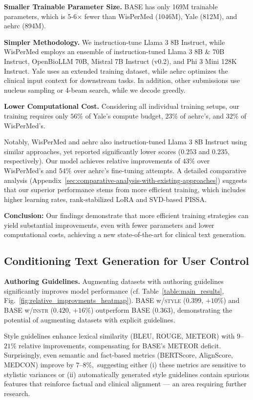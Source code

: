 \textbf{Smaller Trainable Parameter Size.} BASE has only 169M trainable parameters, which is 5-6× fewer than WisPerMed (1046M), Yale (812M), and aehrc (894M).

\textbf{Simpler Methodology.} We instruction-tune Llama 3 8B Instruct, while WisPerMed employs an ensemble of instruction-tuned Llama 3 8B \& 70B Instruct, OpenBioLLM 70B, Mistral 7B Instruct (v0.2), and Phi 3 Mini 128K Instruct. Yale uses an extended training dataset, while aehrc optimizes the clinical input context for downstream tasks. In addition, other submissions use nucleus sampling or 4-beam search, while we decode greedly.

\textbf{Lower Computational Cost.} Considering all individual training setups, our training requires only $56\%$ of Yale’s compute budget, $23\%$ of aehrc’s, and $32\%$ of WisPerMed’s.

Notably, WisPerMed and aehrc also instruction-tuned Llama 3 8B Instruct using similar approaches, yet reported significantly lower scores ($0.253$ and $0.235$, respectively). Our model achieves relative improvements of $43\%$ over WisPerMed's and $54\%$ over aehrc's fine-tuning attempts. A detailed comparative analysis (Appendix~\ref{sec:comparative-analysis-with-existing-approaches}) suggests that our superior performance stems from more efficient training, which includes higher learning rates, rank-stabilized LoRA and SVD-based PISSA.

\textbf{Conclusion:} Our findings demonstrate that more efficient training strategies can yield substantial improvements, even with fewer parameters and lower computational costs, achieving a new state-of-the-art for clinical text generation.

\subsection{Conditioning Text Generation for User Control}
\label{sec:conditioning-text-generation-for-user-control}
\textbf{Authoring Guidelines.} Augmenting datasets with authoring guidelines significantly improves model performance (cf. Table~\ref{table:main_results}, Fig.~\ref{fig:relative_improvments_heatmap}). BASE w/\textsc{style} ($0.399$, $+10\%$) and BASE w/\textsc{instr} ($0.420$, $+16\%$) outperform BASE ($0.363$), demonstrating the potential of augmenting datasets with explicit guidelines. 

Style guidelines enhance lexical similarity (BLEU, ROUGE, METEOR) with $9$–$21\%$ relative improvements, compensating for BASE’s METEOR deficit. Surprisingly, even semantic and fact-based metrics (BERTScore, AlignScore, MEDCON) improve by $7$–$8\%,$ suggesting either (i) these metrics are sensitive to stylistic variances or (ii) automatically generated style guidelines contain spurious features that reinforce factual  and clinical alignment --- an area requiring further research.

